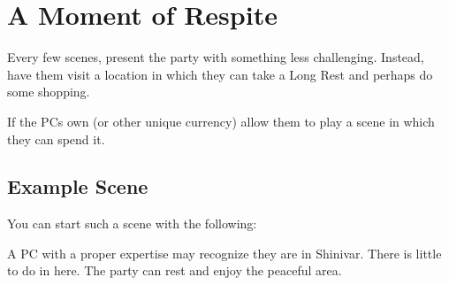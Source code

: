 \section{A Moment of Respite}
\label{sec:momentOfRespite}

Every few scenes, present the party with something less challenging. Instead, have them visit a location in which they can take a Long Rest and perhaps do some shopping. 

If the PCs own \lootScadrialCoin{} (or other unique currency) allow them to play a scene in which they can spend it.



\subsection{Example Scene}

You can start such a scene with the following:


A PC with a proper expertise may recognize they are in Shinivar. There is little to do in here. The party can rest and enjoy the peaceful area.